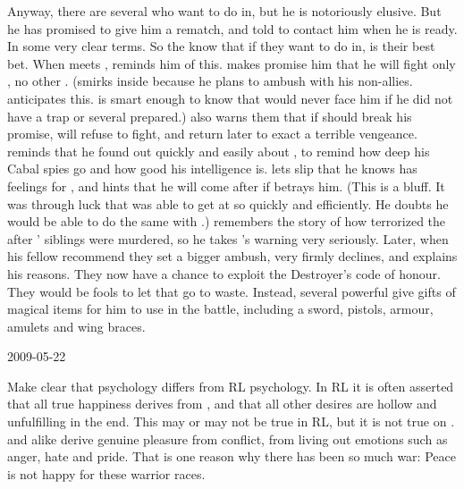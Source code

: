 Anyway, there are several \resphain who want to do \Ishnaruchaefir in, but he is notoriously elusive.
But he has promised \Teshrial to give him a rematch, and told \Teshrial to contact him when he is ready.
In some very clear terms.
So the \resphain know that if they want to do \Ishnaruchaefir in, \Teshrial is their best bet.
When \Teshrial meets \Ishnaruchaefir, \Ishnaruchaefir reminds him of this. 
\Ishnaruchaefir makes \Teshrial promise him that he will fight only \Teshrial, no other \resphain. 
(\Teshrial smirks inside because he plans to ambush \Ishnaruchaefir with his non-\resphan allies. \Ishnaruchaefir anticipates this. \Ishnaruchaefir is smart enough to know that \Teshrial would never face him if he did not have a trap or several prepared.)
\Ishnaruchaefir also warns them that if \Teshrial should break his promise, \Ishnaruchaefir will refuse to fight, and return later to exact a terrible vengeance.
\Ishnaruchaefir reminds \Teshrial that he found out quickly and easily about \Urizeth, to remind \Teshrial how deep his Cabal spies go and how good his intelligence is.
\Ishnaruchaefir lets slip that he knows \Teshrial has feelings for \Firaxel, and hints that he will come after \Firaxel if \Teshrial betrays him. 
(This is a bluff. It was through luck that \Ishnaruchaefir was able to get at \Urizeth so quickly and efficiently. He doubts he would be able to do the same with \Firaxel.)
\Teshrial remembers the story of how \Ishnaruchaefir terrorized the \resphain after \Criseis' siblings were murdered, so he takes \Ishnaruchaefir's warning very seriously.
Later, when his fellow \resphain recommend they set a bigger ambush, \Teshrial very firmly declines, and explains his reasons.
They now have a chance to exploit the Destroyer's code of honour. 
They would be fools to let that go to waste. 
Instead, several powerful \resphain give \Teshrial gifts of magical items for him to use in the battle, including a sword, pistols, armour, amulets and wing braces.



2009-05-22

Make clear that \Miithian psychology differs from RL psychology.
In RL it is often asserted that all true happiness derives from , and that all other desires are hollow and unfulfilling in the end.
This may or may not be true in RL, but it is not true on \Miith.
\Resphain and \dragons alike derive genuine pleasure from conflict, from living out  emotions such as anger, hate and pride.
That is one reason why there has been so much war:
Peace is not happy for these warrior races.

